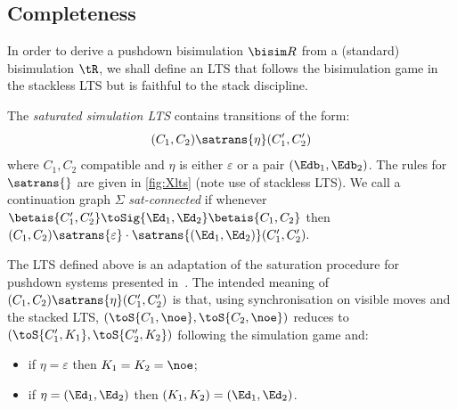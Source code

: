 \subsection{Completeness}\label{sec:completeness}
In order to derive a pushdown bisimulation $\bisim R$ from a (standard) bisimulation $\tR$, we shall 
define an LTS that follows the bisimulation game in the stackless LTS but is faithful to the stack discipline.
 
 \begin{definition}\label{def:sat}
   The  \emph{saturated simulation LTS} contains transitions of the form:
  \[
    (C_1,C_2)\satrans{\eta}(C_1',C_2') 
  \]
  where
$C_1,C_2$ compatible and
  $\eta$ is either $\varepsilon$ or a pair $(\Edb_1,\Edb_2)$. 
  The rules for $\satrans{}$ are given in \cref{fig:Xlts} (note use of stackless LTS). 
%
We call a continuation graph $\Sigma$ \emph{sat-connected} if whenever $\betais{C_1',C_2'}\toSig{\Ed_1,\Ed_2}\betais{C_1,C_2}$ then
$
 (C_1,C_2)\satrans{\varepsilon}\cdot\satrans{(\Ed_1,\Ed_2)}(C_1', C_2').
$
\end{definition}

\begin{remark}
The LTS defined above is an adaptation of the saturation procedure for pushdown systems presented in~\cite{FinkelWW97}.
The intended meaning of
$    (C_1,C_2)\satrans{\eta}(C_1',C_2') $
is that, using synchronisation on visible moves and %
the stacked LTS, $(\toS{C_1,\noe},\toS{C_2,\noe})$ reduces to $(\toS{C_1',K_1},\toS{C_2',K_2})$  following the simulation game and:
  \begin{itemize}
  \item if $\eta=\varepsilon$ then $K_1=K_2=\noe$;
  \item if $\eta=(\Ed_1,\Ed_2)$ then $(K_1,K_2)=(\Ed_1,\Ed_2)$.
  \end{itemize}
\end{remark}

